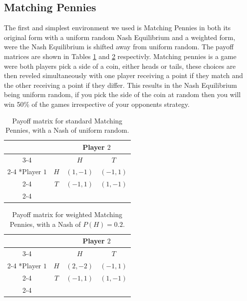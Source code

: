 \documentclass[conference]{IEEEtran}
\begin{document}
\subsection{Matching Pennies}

The first and simplest environment we used is Matching Pennies in both its original form with a uniform random Nash Equilibrium and a weighted form, were the Nash Equilibrium is shifted away from uniform random. The payoff matrices are shown in Tables \ref{tab:stock-mp} and \ref{tab:weighted-mp} respectivly. 
Matching pennies is a game were both players pick a side of a coin, either heads or tails, these choices are then reveled simultaneously with one player receiving a point if they match and the other receiving a point if they differ. This results in the Nash Equilibrium being uniform random, if you pick the side of the coin at random then you will win 50\% of the games irrespective of your opponents strategy.

\begin{table}
    \centering
    \setlength{\extrarowheight}{2pt}
    \begin{tabular}{*{4}{c|}}
      \multicolumn{2}{c}{} & \multicolumn{2}{c}{Player $2$}\\\cline{3-4}
      \multicolumn{1}{c}{} &  & $H$  & $T$ \\\cline{2-4}
      \multirow{2}*{Player $1$}  & $H$ & $(1,-1)$ & $(-1,1)$ \\\cline{2-4}
      & $T$ & $(-1,1)$ & $(1,-1)$ \\\cline{2-4}
    \end{tabular}
    \caption{Payoff matrix for standard Matching Pennies, with a Nash of uniform random.}
    \label{tab:stock-mp}
\end{table}

\begin{table}
    \centering
    \setlength{\extrarowheight}{2pt}
    \begin{tabular}{*{4}{c|}}
      \multicolumn{2}{c}{} & \multicolumn{2}{c}{Player $2$}\\\cline{3-4}
      \multicolumn{1}{c}{} &  & $H$  & $T$ \\\cline{2-4}
      \multirow{2}*{Player $1$}  & $H$ & $(2,-2)$ & $(-1,1)$ \\\cline{2-4}
      & $T$ & $(-1,1)$ & $(1,-1)$ \\\cline{2-4}
    \end{tabular}
    \caption{Payoff matrix for weighted Matching Pennies, with a Nash of $P(H)=0.2$.}
    \label{tab:weighted-mp}
\end{table}
\end{document}
